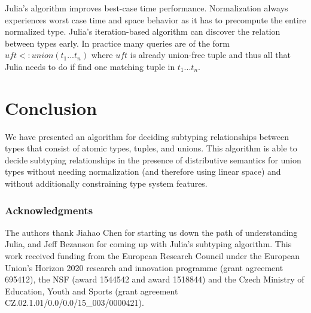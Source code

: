 \documentclass[a4paper,english]{lipics-v2019}
\begin{document}
Julia's algorithm improves best-case time performance.  Normalization always
experiences worst case time and space behavior as it has to precompute the
entire normalized type. Julia's iteration-based algorithm can discover the
relation between types early. In practice many queries are of the form $uft
<: union(t_1...t_n)$ where $uft$ is already union-free tuple and thus all
that Julia needs to do if find one matching tuple in $t_1 ... t_n$.

\section{Conclusion}

We have presented an algorithm for deciding subtyping relationships between
types that consist of atomic types, tuples, and unions. This algorithm is able
to decide subtyping relationships in the presence of distributive semantics
for union types without needing normalization (and therefore using linear
space) and without additionally constraining type system features.

\subsubsection*{Acknowledgments}
The authors thank Jiahao Chen for starting us down the path of understanding
Julia, and Jeff Bezanson for coming up with Julia's subtyping algorithm.  This
work received funding from the European Research Council under the European
Union's Horizon 2020 research and innovation programme (grant agreement
695412), the NSF (award 1544542 and award 1518844) and the Czech Ministry of
Education, Youth and Sports (grant agreement
CZ.02.1.01/0.0/0.0/15\_003/0000421).
 

%

\end{document}
